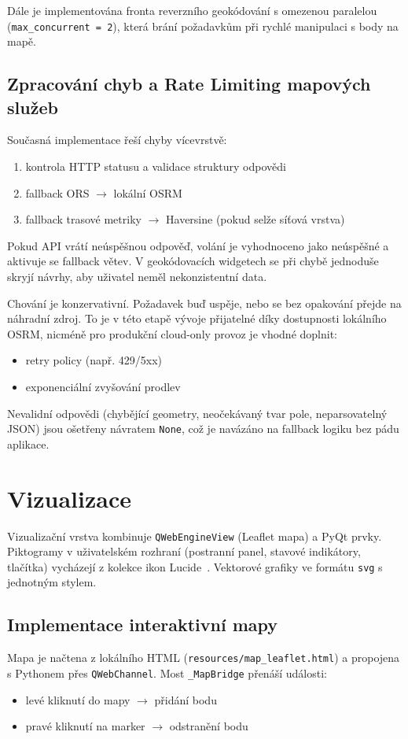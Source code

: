 Dále je implementována fronta reverzního geokódování s omezenou paralelou (\texttt{max\_concurrent = 2}), která brání požadavkům při rychlé manipulaci s body na mapě.

\subsection{Zpracování chyb a Rate Limiting mapových služeb}
Současná implementace řeší chyby vícevrstvě:
\begin{enumerate}
    \item kontrola HTTP statusu a validace struktury odpovědi
    \item fallback ORS \(\rightarrow\) lokální OSRM
    \item fallback trasové metriky \(\rightarrow\) Haversine (pokud selže síťová vrstva)
\end{enumerate}

Pokud API vrátí neúspěšnou odpověď, volání je vyhodnoceno jako neúspěšné a aktivuje se fallback větev. V geokódovacích widgetech se při chybě jednoduše skryjí návrhy, aby uživatel neměl nekonzistentní data.

Chování je konzervativní. Požadavek buď uspěje, nebo se bez opakování přejde na náhradní zdroj. To je v této etapě vývoje přijatelné díky dostupnosti lokálního OSRM, nicméně pro produkční cloud-only provoz je vhodné doplnit:
\begin{itemize}
    \item retry policy (např. 429/5xx)
    \item exponenciální zvyšování prodlev
\end{itemize}

Nevalidní odpovědi (chybějící geometry, neočekávaný tvar pole, neparsovatelný JSON) jsou ošetřeny návratem \texttt{None}, což je navázáno na fallback logiku bez pádu aplikace.

\section{Vizualizace}
Vizualizační vrstva kombinuje \texttt{QWebEngineView} (Leaflet mapa) a PyQt prvky. Piktogramy v uživatelském rozhraní (postranní panel, stavové indikátory, tlačítka) vycházejí z kolekce ikon Lucide~\cite{lucide_dev}. Vektorové grafiky ve formátu \texttt{svg} s jednotným stylem.

\subsection{Implementace interaktivní mapy}
Mapa je načtena z lokálního HTML (\texttt{resources/map\_leaflet.html}) a propojena s Pythonem přes \texttt{QWebChannel}. Most \texttt{\_MapBridge} přenáší události:
\begin{itemize}
    \item levé kliknutí do mapy \(\rightarrow\) přidání bodu
    \item pravé kliknutí na marker \(\rightarrow\) odstranění bodu
\end{itemize}

